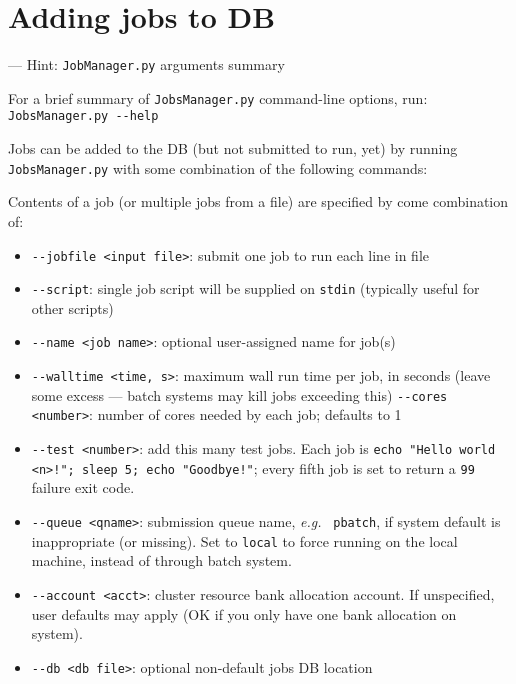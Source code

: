 \documentclass[12pt,english]{article}
\newenvironment{hint}[1][{}]{
\definecolor{shadecolor}{rgb}{.9,.9,.9}
\begin{shaded}
{\color{purple}--- Hint: #1}

}{\end{shaded}}
\newcommand{\cd}[1]{\texorpdfstring{{\color{blue} \texttt{#1}}}{#1}}
\newcommand{\eg}{{\em e.g.}}
\begin{document}
\section{Adding jobs to DB}

\begin{hint}[\cd{JobManager.py} arguments summary]
For a brief summary of \cd{JobsManager.py} command-line options, run: \newline
\cd{JobsManager.py {-}{-}help}
\end{hint}

Jobs can be added to the DB (but not submitted to run, yet) by running
    \cd{JobsManager.py} with some combination of the following commands:

Contents of a job (or multiple jobs from a file) are specified by come combination of:
\begin{itemize}
    \item \cd{{-}{-}jobfile <input file>}: submit one job to run each line in file
    \item \cd{{-}{-}script}: single job script will be supplied on \cd{stdin} (typically useful for other scripts)
    \item \cd{{-}{-}name <job name>}: optional user-assigned name for job(s)
    \item \cd{{-}{-}walltime <time, s>}: maximum wall run time per job, in seconds (leave some excess --- batch systems may kill jobs exceeding this) \cd{{-}{-}cores <number>}: number of cores needed by each job; defaults to 1
    \item \cd{{-}{-}test <number>}: add this many test jobs.
        Each job is \cd{echo "Hello world <n>!"; sleep 5; echo "Goodbye!"};
        every fifth job is set to return a \cd{99} failure exit code.
    \item \cd{{-}{-}queue <qname>}: submission queue name, \eg\ \cd{pbatch},
        if system default is inappropriate (or missing).
        Set to \cd{local} to force running on the local machine, instead of through batch system.
    \item \cd{{-}{-}account <acct>}: cluster resource bank allocation account.
        If unspecified, user defaults may apply (OK if you only have one bank allocation on system).
    \item \cd{{-}{-}db <db file>}: optional non-default jobs DB location
\end{itemize}

\end{document}
